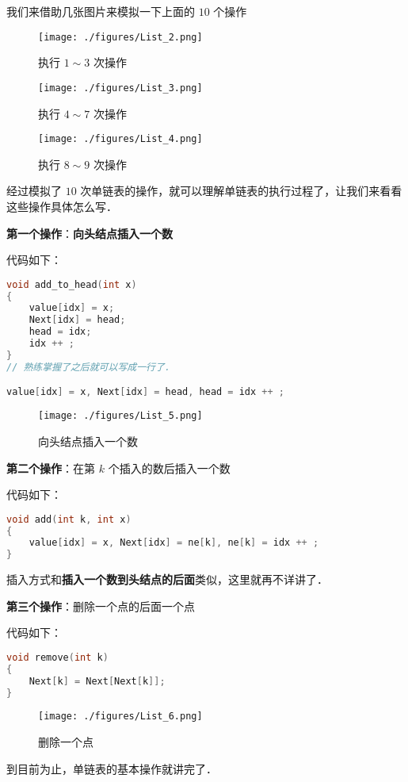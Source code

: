 我们来借助几张图片来模拟一下上面的 $10$ 个操作

\begin{figure}[ht]
\centering
\texttt{[image: ./figures/List\_2.png]}
\caption{执行 $1\sim3$ 次操作} \label{List_fig2}
\end{figure}

\begin{figure}[ht]
\centering
\texttt{[image: ./figures/List\_3.png]}
\caption{执行 $4\sim7$ 次操作} \label{List_fig3}
\end{figure}

\begin{figure}[ht]
\centering
\texttt{[image: ./figures/List\_4.png]}
\caption{执行 $8\sim9$ 次操作} \label{List_fig4}
\end{figure}

经过模拟了 $10$ 次单链表的操作，就可以理解单链表的执行过程了，让我们来看看这些操作具体怎么写．

\textbf{第一个操作}：\textbf{向头结点插入一个数}

代码如下：

\begin{lstlisting}[language=cpp]
void add_to_head(int x) 
{
    value[idx] = x;
    Next[idx] = head;
    head = idx;
    idx ++ ;
}
// 熟练掌握了之后就可以写成一行了．

value[idx] = x, Next[idx] = head, head = idx ++ ;
\end{lstlisting}

\begin{figure}[ht]
\centering
\texttt{[image: ./figures/List\_5.png]}
\caption{向头结点插入一个数} \label{List_fig5}
\end{figure}



\textbf{第二个操作}：在第 $k$ 个插入的数后插入一个数


代码如下：

\begin{lstlisting}[language=cpp]
void add(int k, int x)
{
    value[idx] = x, Next[idx] = ne[k], ne[k] = idx ++ ;
}
\end{lstlisting}

插入方式和\textbf{插入一个数到头结点的后面}类似，这里就再不详讲了．

\textbf{第三个操作}：删除一个点的后面一个点

代码如下：

\begin{lstlisting}[language=cpp]
void remove(int k)
{
    Next[k] = Next[Next[k]];
}
\end{lstlisting}

\begin{figure}[ht]
\centering
\texttt{[image: ./figures/List\_6.png]}
\caption{删除一个点} \label{List_fig6}
\end{figure}

到目前为止，单链表的基本操作就讲完了．